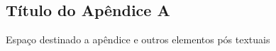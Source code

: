\begin{apendicesenv}

\chapter*{Título do Apêndice A}

Espaço destinado a apêndice e outros elementos pós textuais


\end{apendicesenv}